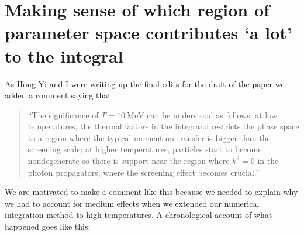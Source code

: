 \section{Making sense of which region of parameter space contributes `a lot' to the integral}

\newcommand{\MeV}{~\mathrm{MeV}}

As Hong Yi and I were writing up the final edits for the draft of the paper we added a comment saying that 
\begin{quote}
    ``The significance of $T = 10\MeV$ can be understood as follows: at low temperatures, the thermal factors in the integrand restricts the phase space to a region where the typical momentum transfer is bigger than the screening scale; at higher temperatures, particles start to become nondegenerate so there is support near the region where $k^2=0$ in the photon propagators, where the screening effect becomes crucial.''
\end{quote}
We are motivated to make a comment like this because we needed to explain why we had to account for medium effects when we extended our numerical integration method to high temperatures. 
A chronological account of what happened goes like this:
